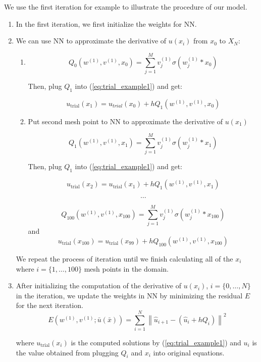 \documentclass{article}
\begin{document}
	We use the first iteration for example to illustrate the procedure of our model. 
	\begin{enumerate}
	
	
		\item In the first iteration, we first initialize the weights for NN. 
		
		\item  We can use NN to approximate the derivative of $u(x_i)$  from $x_0$ to $X_N$:
		
		\begin{enumerate}
		
			\item 
	\[Q_0(w^{(1)},v^{(1)},x_0)=  \sum_{j=1}^{M}  v_{j}^{(1)}\sigma (w_{j}^{(1)}*x_0)\]
	
	
	Then, plug $Q_1$ into (\ref{eq:trial_example1}) and get:
	
	\[u_{\mathrm{trial}}(x_{1})=  u_{trial}(x_{0}) + hQ_1(w^{(1)},v^{(1)},x_0)\]
	
		\item 
	Put second mesh point to NN to approximate the derivative of $u(x_1)$ 
	
	\[Q_1(w^{(1)},v^{(1)},x_1)=  \sum_{j=1}^{M}  v_{j}^{(1)}\sigma (w_{j}^{(1)}*x_1)\]
	
		
	Then, plug $Q_1$ into (\ref{eq:trial_example1}) and get:
	
	\[u_{\mathrm{trial}}(x_{2})=  u_{\text{trial}}(x_{1}) + hQ_1(w^{(1)},v^{(1)},x_1)\]
	
  
	
  \[\dots\]
  
	 \[Q_{100}(w^{(1)},v^{(1)},x_{100})=  \sum_{j=1}^{M}  v_{j}^{(1)}\sigma (w_{j}^{(1)}*x_{100})\]
	 and
	\[u_{\text{trial}}(x_{100})=  u_{\text{trial}}(x_{99}) + hQ_{100}(w^{(1)},v^{(1)},x_{100})\]
	        \end{enumerate}
	We repeat the process of iteration until we finish calculating all of the $x_i$ where $i=\{1, \dots, 100\}$ mesh points in the domain.    
	

	\item After initializing the computation of the derivative of $u(x_i)$, $i=\{0, \dots, N\}$ in the iteration, we update the weights in NN by minimizing the residual $E$ for the next iteration. 
		\[E(w^{(1)},v^{(1)};\bar{u}(\bar{x})) = \sum_{i=1}^{N}\left \| \hat{u}_{i+1} - (\hat{u}_{i}+hQ_{i}) \right\|^{2}\]
		
	where $u_{\text{trial}}(x_i)$ is the computed solutions by  (\ref{eq:trial_example1}) and $u_i$ is the value obtained from plugging $Q_i$ and $x_i$ into original equations.
	

\end{enumerate}
\end{document}
